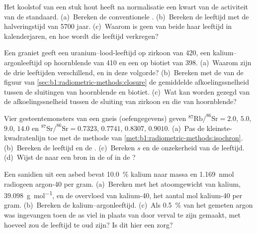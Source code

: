 \begin{exercise}[$\star$]\label{exo:b1:radiometric-methods:3}
Het koolstof van een stuk hout heeft na normalisatie een kwart van de activiteit van de standaard. (a)~Bereken de conventionele . (b)~Bereken de leeftijd met de halveringstijd van \num{5700} jaar. (c)~Waarom is geen van beide haar leeftijd in kalenderjaren, en hoe wordt die leeftijd verkregen?
\end{exercise}

\begin{exercise}[$\star$]\label{exo:b1:radiometric-methods:4}
Een graniet geeft een uranium--lood-leeftijd op zirkoon van \qty{420}{\Ma}, een kalium--argonleeftijd op hoornblende van \qty{410}{\Ma} en een op biotiet van \qty{398}{\Ma}. (a)~Waarom zijn de drie leeftijden verschillend, en in deze volgorde? (b)~Bereken met de  van de figuur van \cref{sec:b1:radiometric-methods:closure} de gemiddelde afkoelingssnelheid tussen de sluitingen van hoornblende en biotiet. (c)~Wat kan worden gezegd van de afkoelingssnelheid tussen de sluiting van zirkoon en die van hoornblende?
\end{exercise}

\begin{exercise}[$\star\star$]\label{exo:b1:radiometric-methods:5}
Vier gesteentemonsters van een gneis (oefengegevens) geven $^{87}\mathrm{Rb}/^{86}\mathrm{Sr} = 2.0$, $5.0$, $9.0$, $14.0$ en $^{87}\mathrm{Sr}/^{86}\mathrm{Sr} = 0.7323$, $0.7741$, $0.8307$, $0.9010$. (a)~Pas de kleinste-kwadratenlijn toe met de methode van \cref{met:b1:radiometric-methods:isochron}. (b)~Bereken de leeftijd en de . (c)~Bereken $s$ en de onzekerheid van de leeftijd. (d)~Wijst de  naar een bron in de  of in de ?
\end{exercise}

\begin{exercise}[$\star\star$]\label{exo:b1:radiometric-methods:6}
Een sanidien uit een asbed bevat \qty{10.0}{\percent} kalium naar massa en \qty{1.169}{nmol} radiogeen argon-40 per gram. (a)~Bereken met het atoomgewicht van kalium, \qty{39.098}{g.mol^{-1}}, en de overvloed van kalium-40, het aantal mol kalium-40 per gram. (b)~Bereken de kalium--argonleeftijd. (c)~Als \qty{0.5}{\percent} van het gemeten argon was ingevangen toen de as viel in plaats van door verval te zijn gemaakt, met hoeveel zou de leeftijd te oud zijn? Is dit hier een zorg?
\end{exercise}

